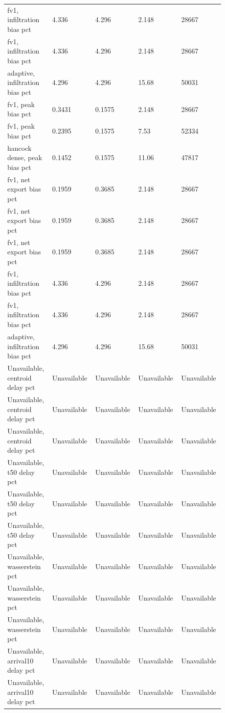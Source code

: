 \begin{longtable}{p{0.1760\linewidth}p{0.1760\linewidth}p{0.1760\linewidth}p{0.1760\linewidth}p{0.1760\linewidth}}
fv1, infiltration bias pct & 4.336 & 4.296 & 2.148 & 28667 \\
fv1, infiltration bias pct & 4.336 & 4.296 & 2.148 & 28667 \\
adaptive, infiltration bias pct & 4.296 & 4.296 & 15.68 & 50031 \\
fv1, peak bias pct & 0.3431 & 0.1575 & 2.148 & 28667 \\
fv1, peak bias pct & 0.2395 & 0.1575 & 7.53 & 52334 \\
hancock dense, peak bias pct & 0.1452 & 0.1575 & 11.06 & 47817 \\
fv1, net export bias pct & 0.1959 & 0.3685 & 2.148 & 28667 \\
fv1, net export bias pct & 0.1959 & 0.3685 & 2.148 & 28667 \\
fv1, net export bias pct & 0.1959 & 0.3685 & 2.148 & 28667 \\
fv1, infiltration bias pct & 4.336 & 4.296 & 2.148 & 28667 \\
fv1, infiltration bias pct & 4.336 & 4.296 & 2.148 & 28667 \\
adaptive, infiltration bias pct & 4.296 & 4.296 & 15.68 & 50031 \\
Unavailable, centroid delay pct & Unavailable & Unavailable & Unavailable & Unavailable \\
Unavailable, centroid delay pct & Unavailable & Unavailable & Unavailable & Unavailable \\
Unavailable, centroid delay pct & Unavailable & Unavailable & Unavailable & Unavailable \\
Unavailable, t50 delay pct & Unavailable & Unavailable & Unavailable & Unavailable \\
Unavailable, t50 delay pct & Unavailable & Unavailable & Unavailable & Unavailable \\
Unavailable, t50 delay pct & Unavailable & Unavailable & Unavailable & Unavailable \\
Unavailable, wasserstein pct & Unavailable & Unavailable & Unavailable & Unavailable \\
Unavailable, wasserstein pct & Unavailable & Unavailable & Unavailable & Unavailable \\
Unavailable, wasserstein pct & Unavailable & Unavailable & Unavailable & Unavailable \\
Unavailable, arrival10 delay pct & Unavailable & Unavailable & Unavailable & Unavailable \\
Unavailable, arrival10 delay pct & Unavailable & Unavailable & Unavailable & Unavailable \\

\end{longtable}
